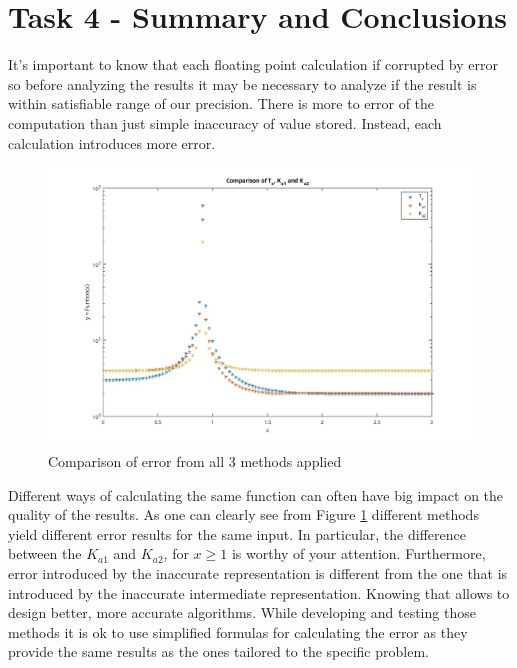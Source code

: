 \section{Task 4 - Summary and Conclusions}

It's important to know that each floating point calculation if corrupted by
error so before analyzing the results it may be necessary to analyze if the
result is within satisfiable range of our precision. There is more to error of
the computation than just simple inaccuracy of value stored. Instead, each
calculation introduces more error.

\begin{figure}[ht]
    \begin{center}
        \includegraphics[width=\textwidth]{Task4.jpg}
    \end{center}
    \caption{Comparison of error from all 3 methods applied}
    \label{fig:task4}
\end{figure}

Different ways of calculating the same function can often have big impact on
the quality of the results. As one can clearly see from Figure \ref{fig:task4}
different methods yield different error results for the same input. In
particular, the difference between the $K_{a1}$ and $K_{a2}$, for $x\geq 1$ is
worthy of your attention. Furthermore, error introduced by the inaccurate
representation is different from the one that is introduced by the inaccurate
intermediate representation. Knowing that allows to design better, more
accurate algorithms. While developing and testing those methods it is ok to use
simplified formulas for calculating the error as they provide the same results
as the ones tailored to the specific problem.
